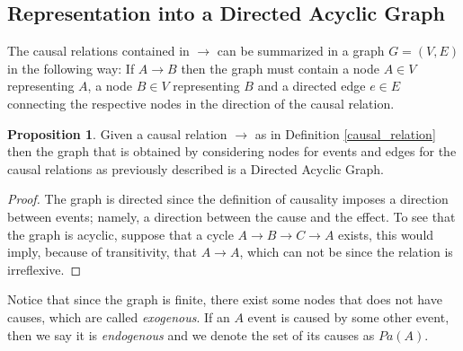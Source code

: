 \documentclass[english,letterpaper,12pt,final]{article}
\theoremstyle{definition}
\newtheorem{prop}{Proposition}[section]
\begin{document}
	\subsection{Representation into a Directed Acyclic Graph}
	The causal relations contained in $\to$ can be summarized in a graph $G=(V,E)$ in the following way: If $A \to B$ then the graph must contain a node $A \in V$ representing $A$, a node  $B \in V$ representing $B$ and a directed edge $e \in E$ connecting the respective nodes in the direction of the causal relation.
	\begin{prop}
	Given a causal relation $\to$ as in Definition \ref{causal_relation} then the graph that is obtained by considering nodes for events and edges for the causal relations as previously described is a Directed Acyclic Graph.
	\end{prop}
	\begin{proof}
	The graph is directed since the definition of causality imposes a direction between events; namely, a direction between the cause and the effect. To see that the graph is acyclic, suppose that a cycle $A \to B \to C \to A$ exists, this would imply, because of transitivity, that $A \to A$, which can not be since the relation is irreflexive.
	\end{proof}
	Notice that since the graph is finite, there exist some nodes that does not have causes, which are called \textit{exogenous}. If an $A$ event is caused by some other event, then we say it is \textit{endogenous} and we denote the set of its causes as $Pa(A)$.
\end{document}
